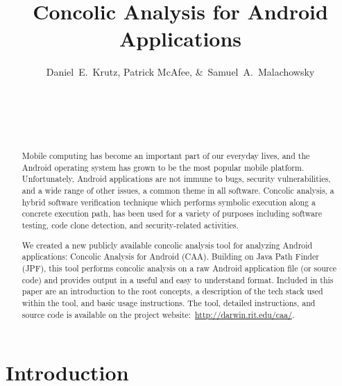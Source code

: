 \documentclass{sig-alternate}
\begin{document}
\title{Concolic Analysis for Android Applications}



\author{
\alignauthor
Daniel~E.~Krutz, Patrick McAfee, \&~Samuel~A.~Malachowsky\\ 	
	\\
       \\
       \\
        \\
       \alignauthor
} %

\maketitle

\begin{abstract}

Mobile computing has become an important part of our everyday lives, and the Android operating system has grown to be the most popular mobile platform. Unfortunately, Android applications are not immune to bugs, security vulnerabilities, and a wide range of other issues, a common theme in all software. Concolic analysis, a hybrid software verification technique which performs symbolic execution along a concrete execution path, has been used for a variety of purposes including software testing, code clone detection, and security-related activities.

We created a new publicly available concolic analysis tool for analyzing Android applications: Concolic Analysis for Android (CAA). Building on Java Path Finder (JPF), this tool performs concolic analysis on a raw Android application file (or source code) and provides output in a useful and easy to understand format. Included in this paper are an introduction to the root concepts, a description of the tech stack used within the tool, and basic usage instructions. The tool, detailed instructions, and source code is available on the project website:~\url{http://darwin.rit.edu/caa/}. 


\end{abstract}

\section{Introduction}
\end{document}
